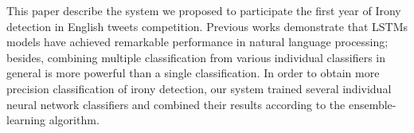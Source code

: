 This paper describe the system we proposed to participate the first year of Irony detection in English tweets competition. Previous works demonstrate that LSTMs models have achieved remarkable performance in natural language processing; besides, combining multiple classification from various individual classifiers in general is more powerful than a single classification. In order to obtain more precision classification of irony detection, our system trained several individual neural network classifiers and combined their results according to the ensemble-learning algorithm.

